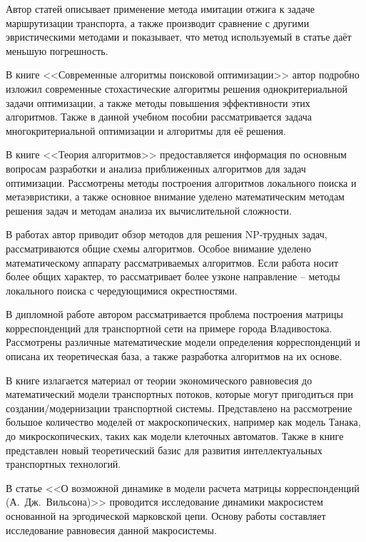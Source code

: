 Автор статей \cite{bib:50,bib:51} описывает применение метода имитации отжига к задаче маршрутизации 
транспорта, а также производит сравнение с другими эвристическими методами и показывает, что метод 
используемый в статье даёт меньшую погрешность.

В книге <<Современные алгоритмы поисковой оптимизации>>\cite{bib:52} автор подробно изложил современные 
стохастические алгоритмы решения однокритериальной задачи оптимизации, а также методы повышения 
эффективности этих алгоритмов. Также в данной учебном пособии рассматривается задача многокритериальной 
оптимизации и алгоритмы для её решения.

В книге <<Теория алгоритмов>>\cite{bib:53} предоставляется информация по основным вопросам разработки и 
анализа приближенных алгоритмов для задач оптимизации. Рассмотрены методы построения алгоритмов 
локального поиска и метаэвристики, а также основное внимание уделено математическим методам решения задач 
и методам анализа их вычислительной сложности.

В работах \cite{bib:54,bib:57} автор приводит обзор методов для решения NP-трудных задач, рассматриваются 
общие схемы алгоритмов. Особое внимание уделено математическому аппарату рассматриваемых алгоритмов. 
Если работа \cite{bib:54} носит более общих характер, то \cite{bib:57} рассматривает более узконе 
направление -- методы локального поиска с чередующимися окрестностями.

В дипломной работе \cite{bib:22} автором рассматривается проблема построения матрицы корреспонденций для 
транспортной сети на примере города Владивостока. Рассмотрены различные математические модели определения 
корреспонденций и описана их теоретическая база, а также разработка алгоритмов на их основе.

В книге \cite{bib:23} излагается материал от теории экономического равновесия до математический модели 
транспортных потоков, которые могут пригодиться при создании/модернизации транспортной системы. Представлено 
на рассмотрение большое количество моделей от макроскопических, например как модель Танака, до 
микроскопических, таких как модели клеточных автоматов. Также в книге представлен новый теоретический базис 
для развития интеллектуальных транспортных технологий.

В статье <<О возможной динамике в модели расчета матрицы корреспонденций (А.~Дж.~Вильсона)>>\cite{bib:24} 
проводится исследование динамики макросистем основанной на эргодической марковской цепи. Основу работы 
составляет исследование равновесия данной макросистемы.

